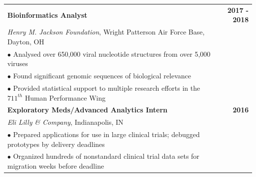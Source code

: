 \documentclass[10pt, hidelinks]{article}
\begin{document}
\begin{tabular}{p{15.5cm}r}
\textbf{Bioinformatics Analyst} & \textbf{2017 - 2018} \\
\textit{Henry M. Jackson Foundation}, Wright Patterson Air Force Base, Dayton, OH & \\
\hspace{10px} $\bullet$ Analysed over 650,000 viral nucleotide structures from over 5,000 viruses \\
\hspace{10px} $\bullet$ Found significant genomic sequences of biological relevance & \\
\hspace{10px} $\bullet$ Provided statistical support to multiple research efforts in the $711^{th}$ Human Performance Wing & \vspace{1px}\\


\textbf{Exploratory Meds/Advanced Analytics Intern} & \textbf{2016} \\
\textit{Eli Lilly \& Company}, Indianapolis, IN & \\
\hspace{10px} $\bullet$ Prepared applications for use in large clinical trials; debugged prototypes by delivery deadlines & \\
\hspace{10px} $\bullet$ Organized hundreds of nonstandard clinical trial data sets for migration weeks before deadline & \\
\end{tabular}

\vspace{2px}
\hspace{-20px} \hrulefill

\vspace{8px}
\end{document}
